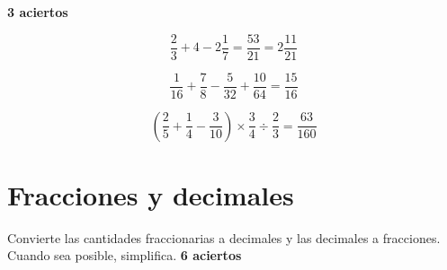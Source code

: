 \documentclass[11pt]{article}
\begin{document}
\textbf{3 aciertos}

\vspace{5mm}

\begin{equation}
    \frac{2}{3} + 4 - 2 \frac{1}{7}= \frac{53}{21} = 2\frac{11}{21} \nonumber
\end{equation}

\vspace{3cm}

\begin{equation}
    \frac{1}{16} + \frac{7}{8} - \frac{5}{32} + \frac{10}{64} = \frac{15}{16} \nonumber
\end{equation}

\vspace{3cm}


\begin{equation}
    \left( \frac{2}{5} + \frac{1}{4} - \frac{3}{10} \right) \times \frac{3}{4} \div \frac{2}{3} = \frac{63}{160} \nonumber
\end{equation}

\vspace{3cm}


\section{Fracciones y decimales}
Convierte las cantidades fraccionarias a decimales y las decimales a fracciones.
Cuando sea posible, simplifica.  \hfill \textbf{6 aciertos}
\end{document}
